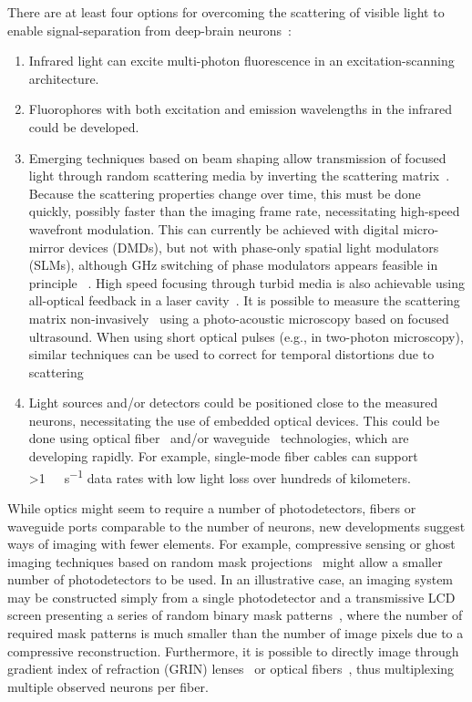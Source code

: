 There are at least four options for overcoming the scattering of visible light to enable signal-separation from deep-brain neurons~\cite{alivisatos2012brain, alivisatos13}:

\begin{enumerate}
\item Infrared light can excite multi-photon fluorescence in an excitation-scanning architecture.
\item Fluorophores with both excitation and emission wavelengths in the infrared could be developed.
\item Emerging techniques based on beam shaping allow transmission of focused light through random scattering media by inverting the scattering matrix~\cite{conkey12}.
Because the scattering properties change over time, this must be done quickly, possibly faster than the imaging frame rate, necessitating high-speed wavefront modulation.
This can currently be achieved with digital micro-mirror devices (DMDs), but not with phase-only spatial light modulators (SLMs), although GHz switching of phase modulators appears feasible in principle ~\cite{alivisatos13}. High speed focusing through turbid media is also achievable using all-optical feedback in a laser cavity~\cite{Nixon2013}.
It is possible to measure the scattering matrix non-invasively~\cite{Chaigne2013} using a photo-acoustic microscopy based on focused ultrasound. When using short optical pulses (e.g., in two-photon microscopy), similar techniques can be used to correct for temporal distortions due to scattering \cite{mccabe2011spatio, katz2011focusing}
\item Light sources and/or detectors could be positioned close to the measured neurons, necessitating the use of embedded optical devices.
This could be done using optical fiber~\cite{mahalati13} and/or waveguide~\cite{zorzos10,zorzos12} technologies, which are developing rapidly.
For example, single-mode fiber cables can support \SI{>1}{\tera\byte\per\second} data rates with low light loss over hundreds of kilometers.
\end{enumerate}

While optics might seem to require a number of photodetectors, fibers or waveguide ports comparable to the number of neurons, new developments suggest ways of imaging with fewer elements.
For example, compressive sensing or ghost imaging techniques based on random mask projections~\cite{wakin06,studer12,tian11,sun13} might allow a smaller number of photodetectors to be used.
In an illustrative case, an imaging system may be constructed simply from a single photodetector and a transmissive LCD screen presenting a series of random binary mask patterns~\cite{huang13}, where the number of required mask patterns is much smaller than the number of image pixels due to a compressive reconstruction.
Furthermore, it is possible to directly image through gradient index of refraction (GRIN) lenses~\cite{murray12} or optical fibers~\cite{mahalati13,kang10,flusberg05}, thus multiplexing multiple observed neurons per fiber.

